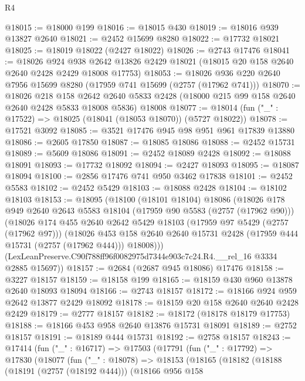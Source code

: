 \begin{lexlean}{R4}
\begin{coremodule}
@18015 := @18000 @199
@18016 := @18015 @430
@18019 := @18016 @939 @13827 @2640
@18021 := @2452 @15699 @8280
@18022 := @17732 @18021
@18025 := @18019 @18022 (@2427 @18022)
@18026 := @2743 @17476
@18041 := @18026
    @924
    @938
    @2642
    @13826
    @2429
    @18021
    (@18015 @20 @158 @2640 @2640 @2428 @2429 @18008 @17753)
@18053 := @18026 @936 @220 @2640 @7956 @15699 @8280 (@17959 @741 @15699 (@2757 (@17962 @741)))
@18070 := @18026
    @218
    @158
    @2642
    @2640
    @5833
    @2428
    (@18000 @215 @99 @158 @2640 @2640 @2428 @5833 @18008 @5836)
    @18008
@18077 := @18014 (fun ("_" : @17522) => @18025 (@18041 (@18053 @18070)) (@5727 @18022))
@18078 := @17521 @3092
@18085 := @3521 @17476 @945 @98 @951 @961 @17839 @13880
@18086 := @2605 @17850
@18087 := @18085 @18086
@18088 := @2452 @15731
@18089 := @5609 @18086
@18091 := @2452 @18089 @2428
@18092 := @18088 @18091
@18093 := @17732 @18092
@18094 := @2427 @18093
@18095 := @18087 @18094
@18100 := @2856 @17476 @741 @950 @3462 @17838
@18101 := @2452 @5583
@18102 := @2452 @5429
@18103 := @18088 @2428
@18104 := @18102 @18103
@18153 := @18095
    (@18100
      (@18101 @18104)
      @18086
      (@18026
        @178
        @949
        @2640
        @2643
        @5583
        @18104
        (@17959 @90 @5583 (@2757 (@17962 @90)))
        (@18026
          @174
          @455
          @2640
          @2642
          @5429
          @18103
          (@17959 @97 @5429 (@2757 (@17962 @97)))
          (@18026
            @453
            @158
            @2640
            @2640
            @15731
            @2428
            (@17959 @444 @15731 (@2757 (@17962 @444)))
            @18008)))
      (LexLeanPreserve.C90f788ff96f0082975d7344e903c7c24.R4.__rel_16 @3334 @2885 @15697))
@18157 := @2684 (@2687 @945 @18086) @17476
@18158 := @3227 @18157
@18159 := @18158 @199
@18165 := @18159 @430 @960 @13878 @2640 @18093 @18094
@18166 := @2743 @18157
@18172 := @18166 @924 @959 @2642 @13877 @2429 @18092
@18178 := @18159 @20 @158 @2640 @2640 @2428 @2429
@18179 := @2777 @18157
@18182 := @18172 (@18178 @18179 @17753)
@18188 := @18166 @453 @958 @2640 @13876 @15731 @18091
@18189 := @2752 @18157
@18191 := @18189 @444 @15731
@18192 := @2758 @18157
@18243 := @17414
    (fun ("_" : @16717) =>
    @17503
      (@17791
        (fun ("_" : @17792) =>
        @17830
          (@18077
            (fun ("_" : @18078) =>
            @18153
              (@18165
                (@18182
                  (@18188
                    (@18191 (@2757 (@18192 @444)))
                    (@18166
                      @956
                      @158

\end{coremodule}
\end{lexlean}
